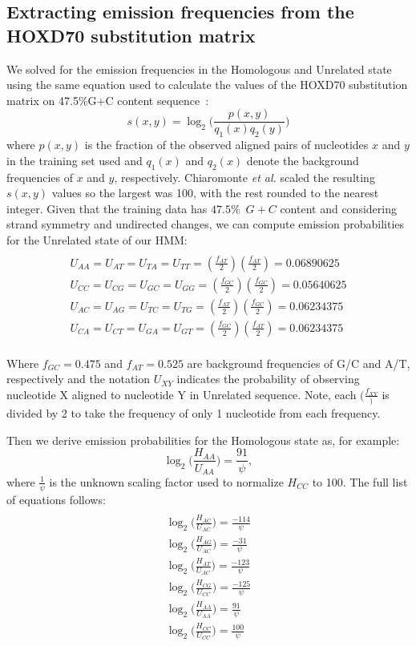 
\subsection{Extracting emission frequencies from the HOXD70 substitution matrix}
We solved for the emission frequencies in the
Homologous and Unrelated state using the same equation used to
calculate the values of the HOXD70 substitution matrix on 47.5\%G+C
content sequence~\cite{hoxd}:
\begin{equation}
s(x,y)= \log_{2}{\Bigg(\frac{p(x,y)}{q_{1}(x)q_{2}(y)}\Bigg)}
\end{equation}
{w}here $p(x,y)$ is the fraction of the observed aligned pairs of
nucleotides $x$ and $y$ in the training set used and $q_{1}(x)$ and
$q_{2}(x)$ denote the background frequencies of $x$ and $y$,
respectively. Chiaromonte \textit{et al.} scaled the resulting
$s(x,y)$ values so the largest was 100,
with the rest rounded to the nearest integer.  Given that the training
data has $47.5\%$~$G+C$ content and considering strand symmetry and undirected changes, we can compute emission probabilities for the Unrelated state
of our HMM:
\begin{multline}\\
U_{AA}=U_{AT}=U_{TA}=U_{TT}=(\frac{f_{AT}}{2})(\frac{f_{AT}}{2})
= 0.06890625 \\
U_{CC}=U_{CG}=U_{GC}=U_{GG}=(\frac{f_{GC}}{2})(\frac{f_{GC}}{2}) =
0.05640625 \\
U_{AC}=U_{AG}=U_{TC}=U_{TG}=(\frac{f_{AT}}{2})(\frac{f_{GC}}{2}) =
0.06234375 \\
U_{CA}=U_{CT}=U_{GA}=U_{GT}=(\frac{f_{GC}}{2})(\frac{f_{AT}}{2}) =
0.06234375 \\
\end{multline}

Where $f_{GC}=0.475$ and $f_{AT}=0.525$ are background frequencies of
G/C and A/T, respectively and the notation $U_{XY}$ indicates the probability of observing nucleotide X aligned to
nucleotide Y in Unrelated sequence.    Note, each $(\frac{f_{XY}})$ is divided by 2 to take the frequency of only 1 nucleotide from each frequency.

Then we derive emission probabilities for
the Homologous state as, for example:
\begin{equation}
\log_{2}\bigg(\frac{H_{AA}}{U_{AA}}\bigg) = \frac{91}{\psi},
\end{equation}
where $\frac{1}{\psi}$ is the unknown scaling factor used to normalize $H_{CC}$ to 100. The full list of equations follows:
\begin{multline}\\
\log_{2}\bigg(\frac{H_{AC}}{U_{AC}}\bigg) = \frac{-114}{\psi}\\
\log_{2}\bigg(\frac{H_{AG}}{U_{AC}}\bigg) = \frac{-31}{\psi}\\
\log_{2}\bigg(\frac{H_{AT}}{U_{AC}}\bigg) = \frac{-123}{\psi}\\
\log_{2}\bigg(\frac{H_{CG}}{U_{CC}}\bigg) = \frac{-125}{\psi}\\
\log_{2}\bigg(\frac{H_{AA}}{U_{AA}}\bigg) = \frac{91}{\psi}\\
\log_{2}\bigg(\frac{H_{CC}}{U_{CC}}\bigg) = \frac{100}{\psi}\\
\end{multline}

